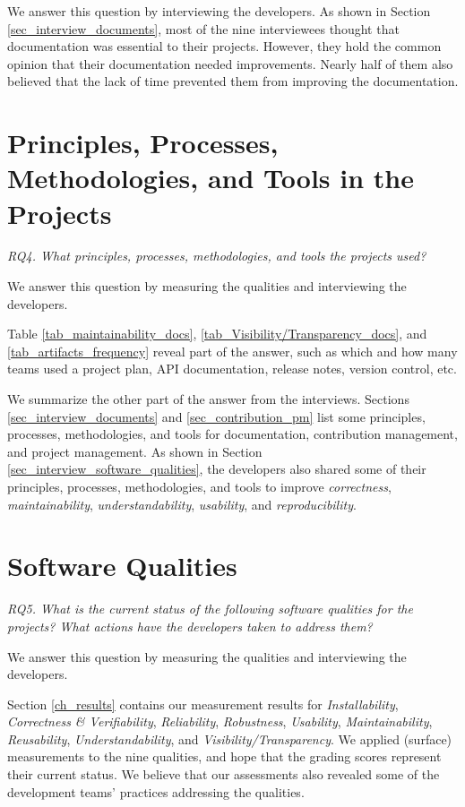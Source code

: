 We answer this question by interviewing the developers. As shown in Section \ref{sec_interview_documents}, most of the nine interviewees thought that documentation was essential to their projects. However, they hold the common opinion that their documentation needed improvements. Nearly half of them also believed that the lack of time prevented them from improving the documentation.

\section{Principles, Processes, Methodologies, and Tools in the Projects}
\label{sec_rq4_PPMT}
\textit{RQ4. What principles, processes, methodologies, and tools the projects used?}

We answer this question by measuring the qualities and interviewing the developers.

Table \ref{tab_maintainability_docs}, \ref{tab_Visibility/Transparency_docs}, and \ref{tab_artifacts_frequency} reveal part of the answer, such as which and how many teams used a project plan, API documentation, release notes, version control, etc.

We summarize the other part of the answer from the interviews. Sections \ref{sec_interview_documents} and \ref{sec_contribution_pm} list some principles, processes, methodologies, and tools for documentation, contribution management, and project management. As shown in Section \ref{sec_interview_software_qualities}, the developers also shared some of their principles, processes, methodologies, and tools to improve \textit{correctness}, \textit{maintainability}, \textit{understandability}, \textit{usability}, and \textit{reproducibility}.

\section{Software Qualities}
\label{sec_rq5_qualities}
\textit{RQ5. What is the current status of the following software qualities for the projects? What actions have the developers taken to address them?}

We answer this question by measuring the qualities and interviewing the developers.

Section \ref{ch_results} contains our measurement results for \textit{Installability}, \textit{Correctness \& Verifiability}, \textit{Reliability}, \textit{Robustness}, \textit{Usability}, \textit{Maintainability}, \textit{Reusability}, \textit{Understandability}, and \textit{Visibility/Transparency}. We applied (surface) measurements to the nine qualities, and hope that the grading scores represent their current status. We believe that our assessments also revealed some of the development teams' practices addressing the qualities. 

